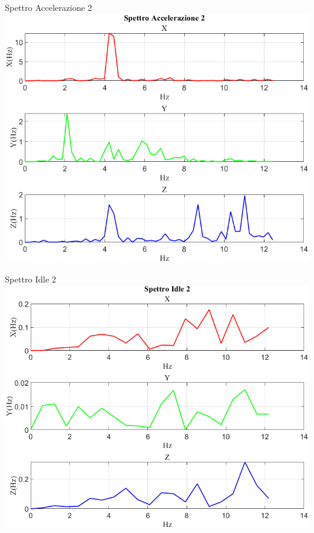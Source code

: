 \documentclass[beamer]{standalone}
\begin{document}
	\begin{frame}{{Spettro Accelerazione 2}}
		\centering\includegraphics[height=.8\textheight]{figure/Acc/Trasformata/Spettro Accelerazione 2}
	\end{frame}
	
	\begin{frame}{{Spettro Idle 2}}
		\centering\includegraphics[height=.8\textheight]{figure/Acc/Trasformata/Spettro Idle 2}
	\end{frame}
	
\end{document}
